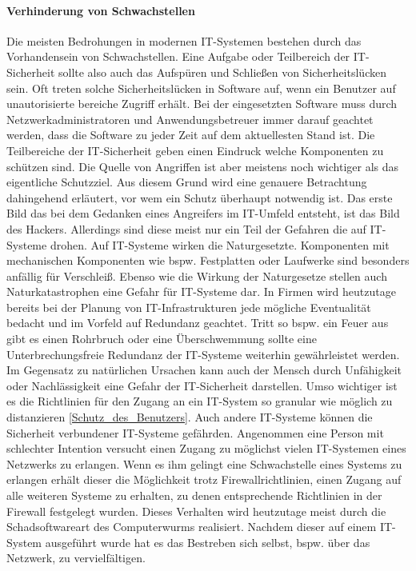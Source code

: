 \documentclass[utf8,biblatex]{lni}
\begin{document}
\paragraph{Verhinderung von Schwachstellen}
Die meisten Bedrohungen in modernen IT-Systemen bestehen durch das Vorhandensein von Schwachstellen. Eine Aufgabe oder Teilbereich der IT-Sicherheit sollte also auch 
das Aufspüren und Schließen von Sicherheitslücken sein. Oft treten solche Sicherheitslücken in Software auf, wenn ein Benutzer auf unautorisierte bereiche Zugriff erhält.
Bei der eingesetzten Software muss durch Netzwerkadministratoren und Anwendungsbetreuer immer darauf geachtet werden, dass die Software zu jeder Zeit auf dem aktuellesten Stand ist. 
\newline
Die Teilbereiche der IT-Sicherheit geben einen Eindruck welche Komponenten zu schützen sind. 
Die Quelle von Angriffen ist aber meistens noch wichtiger als das eigentliche Schutzziel. Aus diesem Grund wird eine genauere Betrachtung dahingehend 
erläutert, vor wem ein Schutz überhaupt notwendig ist. 
\newline
Das erste Bild das bei dem Gedanken eines Angreifers im IT-Umfeld entsteht, ist das Bild des Hackers. Allerdings sind diese meist nur ein Teil der Gefahren die auf IT-Systeme drohen. 
Auf IT-Systeme wirken die Naturgesetzte. Komponenten mit mechanischen Komponenten wie bspw. Festplatten oder Laufwerke sind besonders anfällig für Verschleiß. 
Ebenso wie die Wirkung der Naturgesetze stellen auch Naturkatastrophen eine Gefahr für IT-Systeme dar. In Firmen wird heutzutage bereits bei der Planung von 
IT-Infrastrukturen jede mögliche Eventualität bedacht und im Vorfeld auf Redundanz geachtet. Tritt so bspw. ein Feuer aus gibt es einen Rohrbruch oder eine Überschwemmung sollte 
eine Unterbrechungsfreie Redundanz der IT-Systeme weiterhin gewährleistet werden. 
\newline
Im Gegensatz zu natürlichen Ursachen kann auch der Mensch durch Unfähigkeit oder Nachlässigkeit eine Gefahr der IT-Sicherheit darstellen. 
Umso wichtiger ist es die Richtlinien für den Zugang an ein IT-System so granular wie möglich zu distanzieren \autoref{Schutz_des_Benutzers}.
\newline 
Auch andere IT-Systeme können die Sicherheit verbundener IT-Systeme gefährden. Angenommen eine Person mit schlechter Intention versucht einen Zugang zu möglichst vielen 
IT-Systemen eines Netzwerks zu erlangen. Wenn es ihm gelingt eine Schwachstelle eines Systems zu erlangen erhält dieser die Möglichkeit trotz Firewallrichtlinien, einen Zugang 
auf alle weiteren Systeme zu erhalten, zu denen entsprechende Richtlinien in der Firewall festgelegt wurden. Dieses Verhalten wird heutzutage meist durch die Schadsoftwareart des 
\glqq Computerwurms\grqq{} realisiert. Nachdem dieser auf einem IT-System ausgeführt wurde hat es das Bestreben sich selbst, bspw. über das Netzwerk, zu vervielfältigen.
\end{document}
